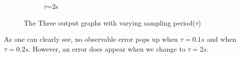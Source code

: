 \documentclass[12pt]{article}
\begin{document}
\begin{figure}[H]
\begin{subfigure}{\textwidth}
            \caption{$\tau$=2s}
            \label{fig:sub-first}
        \end{subfigure}
        \caption{The Three output graphs with varying sampling period($\tau$)}
        \label{fig:fig}
    \end{figure}
    As one can clearly see, no observable error pops up when $\tau=0.1s$ and when $\tau=0.2s$. However, an error does appear when we change to $\tau=2s$.
\end{document}
